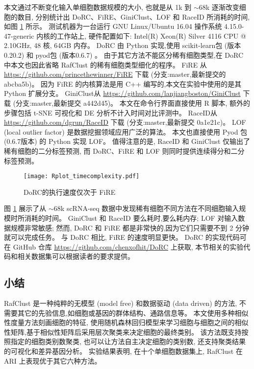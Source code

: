 本文通过不断变化输入单细胞数据规模的大小, 也就是从 1k 到 ${\sim} 68$k 逐渐改变细胞的数目, 
分别统计出 DoRC、FiRE、GiniClust、LOF  和 RaceID 所消耗的时间,
如图 \ref{fig:timecomplexity} 所示。
测试机器为一台运行 GNU Linux/Ubuntu 16.04 操作系统 4.15.0-47-generic 内核的工作站上,
硬件配置如下: Intel(R) Xeon(R) Silver 4116 CPU @ 2.10GHz, 48 核, 64GB 内存。
DoRC 由 Python 实现,使用 scikit-learn包 (版本 0.20.2) 和 pyod包 (版本0.6.7)  。
由于其它方法不能区分稀有细胞类型,在 DoRC 中本文也因此省略 RafClust 的稀有细胞类型细化的程序。
FiRE 从 \url{https://github.com/princethewinner/FiRE} 下载 (分支:master,最新提交的 abcba5b)。
因为 FiRE 的内核算法是用 C++ 编写的,本文在实验中使用的是其 Python 扩展分支。
GiniClust从 \url{https://github.com/lanjiangboston/GiniClust} 下载 (分支:master,最新提交 a442d45)。
本文在命令行界面直接使用 R 脚本,
额外的步骤包括 t-SNE 可视化和 DE 分析不计入时间对比评测中。
RaceID从 \url{https://github.com/dgrun/RaceID} 下载 (分支:master,最新提交 0a1e21c)。
LOF (local outlier factor) 是数据挖掘领域应用广泛的算法。
本文也直接使用 Pyod 包 (0.6.7版本)  的 Python 实现 LOF。
值得注意的是, RaceID 和 GiniClust 仅输出了稀有细胞的二分标签预测,
而 DoRC、FiRE 和 LOF 则同时提供连续得分和二分标签预测。
\begin{figure}[!htbp]
    \centering
    \texttt{[image: Rplot\_timecomplexity.pdf]}
    \caption{
    DoRC的执行速度仅次于 FiRE   
    }
    \label{fig:timecomplexity}
\end{figure}
图 \ref{fig:timecomplexity} 展示了从 ${\sim}68$k scRNA-seq 数据中发现稀有细胞不同方法在不同细胞输入规模时所消耗的时间。 
GiniClust 和 RaceID 要么耗时,要么耗内存;
LOF 对输入数据规模非常敏感;
然而, DoRC 和 FiRE 都是非常快的,因为它们只需要不到 2 分钟就可以完成任务。
与 DoRC 相比, FiRE 的速度明显更快。
DoRC 的实现代码可在 GitHub 仓库 \url{https://github.com/chenxofhit/DoRC} 上获取,
本节相关的实验代码和相关数据集可以根据读者的要求提供。

\subsection{小结}

RafClust 是一种纯粹的无模型 (model free) 和数据驱动 (data driven) 的方法,
不需要其它的先验信息,如细胞或基因的群体结构、通路信息等。
本文使用多种相似性度量方法刻画细胞的特征,
使用随机森林回归模型来学习细胞与细胞之间的相似性矩阵,基于相似性矩阵后采用层次聚类来决定细胞的最终类别。
该方法既支持按照指定的细胞类别数聚类, 也可以让方法自主决定细胞的类别数,
还支持聚类结果的可视化和差异基因分析。
实验结果表明, 在十个单细胞数据集上, RafClust 在 ARI 上表现优于其它六种方法。

